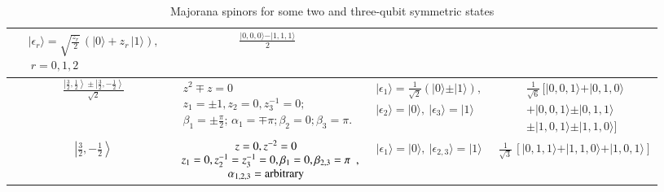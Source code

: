 {\begin{table}
{\begin{tabular}{|c c|c|c|c|}
& 
$\begin{array}{c}\vert \epsilon_{r}\rangle=
  \sqrt{\frac{z_r}{2}}\, \left(\vert0\rangle+z_r\, \vert 1\rangle\right),  \\ \ r=0,1,2\end{array}$
  & $\frac{\vert 0,0,0\rangle - \vert 1,1,1\rangle}{2}$
  \\ 
\hline
&  $\frac{\left\vert \frac{3}{2},\frac{1}{2}\right\rangle
\pm \left\vert \frac{3}{2},-\frac{1}{2}\right\rangle}{\sqrt{2}}$
& $\begin{array}{c} z^2\mp z=0\\  
z_{1}=\pm 1, z_2=0, z_3^{-1}=0;\\
\beta_{1}=\pm \frac{\pi}{2};\, \alpha_1=\mp\pi; \beta_{2}=0; \beta_3=\pi.\end{array}$
& $\begin{array}{c}\vert \epsilon_{1}\rangle=
  \frac{1}{\sqrt{2}}\left(\vert 0\rangle \pm \vert 1\rangle\right),  
 \\  \vert \epsilon_{2}\rangle=\vert 0\rangle, \ 
 \vert \epsilon_{3}\rangle=\vert 1\rangle\end{array} $ 
 & $\begin{array}{l}
\frac{1}{\sqrt{6}}\, [\vert 0,0,1\rangle+\vert 0,1,0\rangle \\ 
+\vert 0,0,1\rangle 
 \pm \vert 0,1,1\rangle\\ 
 \pm \vert 1,0,1\rangle\pm \vert 1,1,0\rangle]
 \end{array}$  \\       
  \hline
 &  $\left\vert \frac{3}{2}, -\frac{1}{2}\right\rangle$
& $\begin{array}{c} z=0, z^{-2}=0 \\
z_{1}=0,z_2^{-1}=z_3^{-1}=0,   \beta_{1}=0, \beta_{2,3}=\pi \\ \alpha_{1,2,3}={\rm arbitrary} \end{array}, $
& $\vert \epsilon_{1}\rangle=\vert0\rangle, \ \vert \epsilon_{2,3}\rangle=\vert 1\rangle$ 
 & $\frac{1}{\sqrt{3}}\, [\vert 0,1,1\rangle+\vert 1,1,0\rangle  
+\vert 1,0,1\rangle]$
 \\
 \hline        

\end{tabular}}
\caption{Majorana spinors for some two and three-qubit symmetric states}
\end{table}


}
